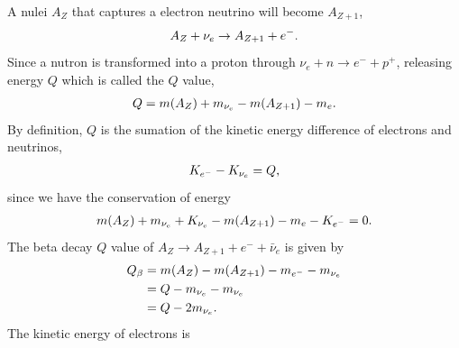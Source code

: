 \documentclass[letterpaper,12pt,english]{sphinxmanual}
\begin{document}
A nulei \(A_Z\) that captures a electron neutrino will become \(A_{Z+1}\),
\begin{gather}
\begin{split}A_Z + \nu_e \to A_{Z+1} + e^-.\end{split}\notag
\end{gather}
Since a nutron is transformed into a proton through \(\nu_e + n\to e^- + p^+\), releasing energy \(Q\) which is called the \(Q\) value,
\begin{gather}
\begin{split}Q = m(A_Z) + m_{\nu_e} - m(A_{Z+1}) - m_e .\end{split}\notag
\end{gather}
By definition, \(Q\) is the sumation of the kinetic energy difference of electrons and neutrinos,
\begin{gather}
\begin{split}K_{e^-} - K_{\nu_e} = Q,\end{split}\notag
\end{gather}
since we have the conservation of energy
\begin{gather}
\begin{split}m(A_Z) + m_{\nu_e} + K_{\nu_e} - m(A_{Z+1}) - m_e -K_{e^-} =0 .\end{split}\notag
\end{gather}
The beta decay \(Q\) value of \(A_Z \to A_{Z+1} + e^- + \bar \nu_e\) is given by
\begin{gather}
\begin{split}Q_\beta &= m(A_Z) - m(A_{Z+1}) - m_{e^-} - m_{\nu_e} \\
& = Q - m_{\nu_e} - m_{\nu_e}\\
&= Q - 2 m_{\nu_e} .\end{split}\notag
\end{gather}
The kinetic energy of electrons is
\end{document}
